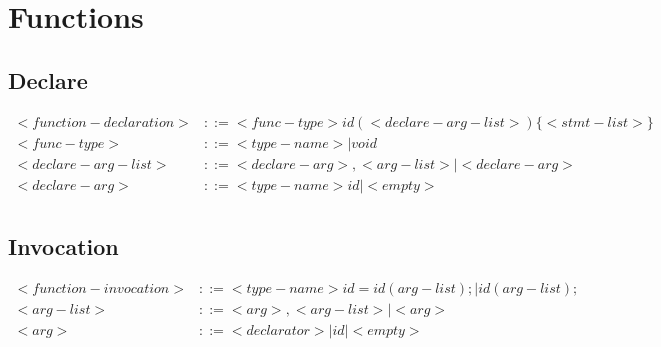 \documentclass{report}
\begin{document}
\section{Functions}

\subsection{Declare}

\begin{equation}
\begin{split}
  <function-declaration> & ::= <func-type> id (<declare-arg-list>) \{ <stmt-list> \} \\
  <func-type> & ::= <type-name> | void \\
  <declare-arg-list> & ::= <declare-arg>, <arg-list> | <declare-arg> \\
  <declare-arg> & ::= <type-name> id | <empty> \\
\end{split}
\end{equation}

\subsection{Invocation}

\begin{equation}
\begin{split}
  <function-invocation> & ::= <type-name> id = id(arg-list); | id(arg-list); \\
  <arg-list> & ::= <arg>, <arg-list> | <arg> \\
  <arg> & ::= <declarator> | id | <empty> \\
\end{split}
\end{equation}
\end{document}
